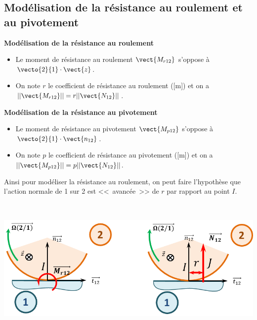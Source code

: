 \documentclass[10pt,fleqn]{article} %
\begin{document}
\subsection{Modélisation de la résistance au roulement et au pivotement}
\noindent\begin{minipage}[t]{.49\linewidth}
\begin{center}
\textbf{Modélisation de la résistance au roulement}
\end{center}
\begin{itemize}
\item Le moment de résistance au roulement $\vect{M_{r12}}$ s'oppose à $\vecto{2}{1}\cdot \vect{z}$. 
\item On note $r$ le coefficient de résistance au roulement ([m]) et on a $||\vect{M_{r12}}||=r||\vect{N_{12}} ||$.
\end{itemize}

\end{minipage}\hfill
\begin{minipage}[t]{.49\linewidth}
\begin{center}
\textbf{Modélisation de la résistance au pivotement}
\end{center}
\begin{itemize}
\item Le moment de résistance au pivotement $\vect{M_{p12}}$ s'oppose à $\vecto{2}{1}\cdot \vect{n_{12}}$. 
\item On note $p$ le coefficient de résistance au pivotement ([m]) et on a $||\vect{M_{p12}}||=p||\vect{N_{12}} ||$.
\end{itemize}
\end{minipage}

\vspace{1cm}

\noindent\begin{minipage}[t]{.69\linewidth}
Ainsi pour modéliser la résistance au roulement, on peut faire l'hypothèse que l'action normale de 1 sur 2 est <<~avancée~>> de $r$ par rapport au point $I$. 
\end{minipage}
\hfill
\begin{minipage}[t]{.29\linewidth}
$\quad$
\vspace{-.5cm}
\begin{center}
\includegraphics[width=\linewidth]{images/fig_04}
\end{center}
\end{minipage}
\end{document}
